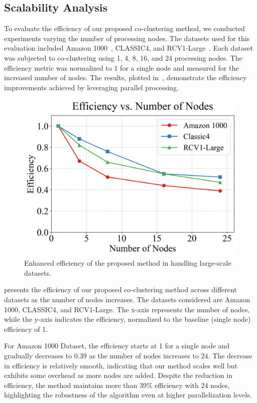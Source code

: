 \documentclass[journal]{IEEEtran}
\renewcommand{\cite}[1]{~\autocite{#1}}
\begin{document}
\subsection{Scalability Analysis}
To evaluate the efficiency of our proposed co-clustering method, we conducted experiments varying the number of processing nodes. The datasets used for this evaluation included Amazon 1000\cite{ni2019JustifyingRecommendationsUsing}, CLASSIC4, and RCV1-Large\cite{lewis2004Rcv1NewBenchmark}. Each dataset was subjected to co-clustering using 1, 4, 8, 16, and 24 processing nodes. The efficiency metric was normalized to 1 for a single node and measured for the increased number of nodes. The results, plotted in~, demonstrate the efficiency improvements achieved by leveraging parallel processing.

\begin{figure}[htbp]
    \centering
    \includegraphics[width=0.8\linewidth]{efficiency.png}
    \caption{Enhanced efficiency of the proposed method in handling large-scale datasets.}
    \label{fig:efficiency}
\end{figure}

 presents the efficiency of our proposed co-clustering method across different datasets as the number of nodes increases. The datasets considered are Amazon 1000, CLASSIC4, and RCV1-Large. The x-axis represents the number of nodes, while the y-axis indicates the efficiency, normalized to the baseline (single node) efficiency of 1.


For Amazon 1000 Dataset, the efficiency starts at 1 for a single node and gradually decreases to 0.39 as the number of nodes increases to 24. The decrease in efficiency is relatively smooth, indicating that our method scales well but exhibits some overhead as more nodes are added. Despite the reduction in efficiency, the method maintains more than 39\% efficiency with 24 nodes, highlighting the robustness of the algorithm even at higher parallelization levels.
\end{document}
